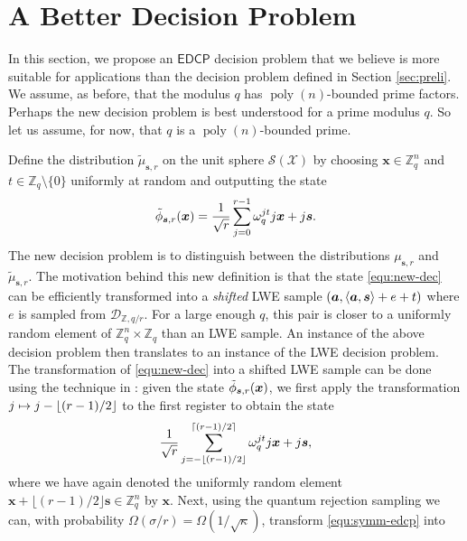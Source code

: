 \documentclass[11pt]{article}
\theoremstyle{plain}
\theoremstyle{definition}
\DeclareMathOperator{\poly}{poly}
\let\ket\relax
\DeclarePairedDelimiter{\ket}{\lvert}{\rangle}
\DeclarePairedDelimiter{\lrang}{\langle}{\rangle}
\def\Z{\mathbb{Z}}
\def\edcp{\mathsf{EDCP}}
\def\SX{\mathcal{S(X)}}
\begin{document}



\section{A Better Decision Problem}
\label{sec:new-decsn}

In this section, we propose an $\edcp$ decision problem that we believe is more suitable for applications than the decision problem defined in Section \ref{sec:preli}. We assume, as before, that the modulus $q$ has $\poly(n)$-bounded prime factors. Perhaps the new decision problem is best understood for a prime modulus $q$. So let us assume, for now, that $q$ is a $\poly(n)$-bounded prime. 

Define the distribution $\tilde{\mu}_{\bm{s}, r}$ on the unit sphere $\SX$ by choosing $\bm{x} \in \Z_q^n$ and $t \in \Z_q {\setminus} \{ 0 \}$ uniformly at random and outputting the state
\begin{equation}
    \label{equ:new-dec}
    \ket{\tilde{\phi}_{\bm{s}, r}(\bm{x})} = \frac{1}{\sqrt{r}} \sum_{j = 0}^{r - 1} \omega_q^{jt} \ket{j}\ket{\bm{x} + j\bm{s}}.
\end{equation}
The new decision problem is to distinguish between the distributions $\mu_{\bm{s}, r}$ and $\tilde{\mu}_{\bm{s}, r}$. The motivation behind this new definition is that the state \eqref{equ:new-dec} can be efficiently transformed into a \textit{shifted} LWE sample $(\bm{a}, \lrang{\bm{a}, \bm{s}} + e + t)$ where $e$ is sampled from $\mathcal{D}_{\Z, q / r}$. For a large enough $q$, this pair is closer to a uniformly random element of $\Z_q^n \times \Z_q$ than an LWE sample. An instance of the above decision problem then translates to an instance of the LWE decision problem. The transformation of \eqref{equ:new-dec} into a shifted LWE sample can be done using the technique in \cite{brakerski2018learning}: given the state $\ket{\tilde{\phi}_{\bm{s}, r}(\bm{x})}$, we first apply the transformation $\ket{j} \mapsto \ket{j - \lfloor (r - 1) / 2 \rfloor}$ to the first register to obtain the state
\begin{equation}
    \label{equ:symm-edcp}
    \frac{1}{\sqrt{r}} \sum_{j = -\lfloor (r - 1) / 2 \rfloor}^{\lceil (r - 1) / 2 \rceil} \omega_q^{jt} \ket{j}\ket{\bm{x} + j\bm{s}},
\end{equation}
where we have again denoted the uniformly random element $\bm{x} + \lfloor (r - 1) / 2 \rfloor \bm{s} \in \Z_q^n$ by $\bm{x}$. Next, using the quantum rejection sampling we can, with probability $\Omega(\sigma / r) = \Omega(1 / \sqrt{\kappa})$, transform \eqref{equ:symm-edcp} into 
\end{document}
